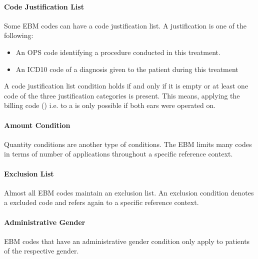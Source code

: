 \paragraph{Code Justification List}
Some EBM codes can have a code justification list.
A justification is one of the following:
\begin{itemize}
    \item An OPS code identifying a procedure conducted in this treatment.
    \item An ICD10 code of a diagnosis given to the patient during this treatment
\end{itemize}
A code justification list condition holds if and only if it is empty or at least one code of the three justification categories is present.
This means, applying the billing code  () i.e.  to a  is only possible if both ears were operated on.

\paragraph{Amount Condition}\label{par:amount-condition}
Quantity conditions are another type of conditions.
The EBM limits many codes in terms of number of applications throughout a specific reference context.

\paragraph{Exclusion List}\label{par:exclusion-list}
Almost all EBM codes maintain an exclusion list.
An exclusion condition denotes a excluded code and refers again to a specific reference context.

\paragraph{Administrative Gender}\label{par:administrative-gender}
EBM codes that have an administrative gender condition only apply to patients of the respective gender.


